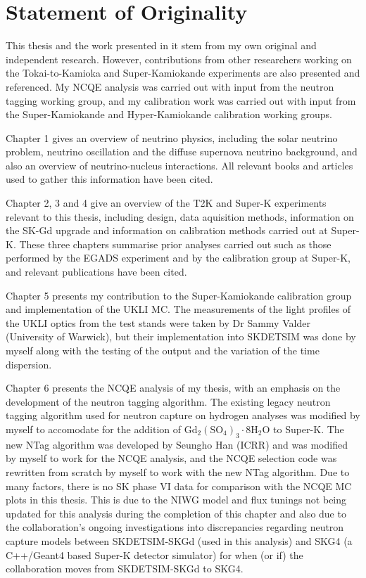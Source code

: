 \chapter*{Statement of Originality}
\thispagestyle{empty}

This thesis and the work presented in it stem from my own original and independent research. However, contributions from other researchers working on the Tokai-to-Kamioka and Super-Kamiokande experiments are also presented and referenced. My NCQE analysis was carried out with input from the neutron tagging working group, and my calibration work was carried out with input from the Super-Kamiokande and Hyper-Kamiokande calibration working groups.

Chapter 1 gives an overview of neutrino physics, including the solar neutrino problem, neutrino oscillation and the diffuse supernova neutrino background, and also an overview of neutrino-nucleus interactions. All relevant books and articles used to gather this information have been cited.

Chapter 2, 3 and 4 give an overview of the T2K and Super-K experiments relevant to this thesis, including design, data aquisition methods, information on the SK-Gd upgrade and information on calibration methods carried out at Super-K. These three chapters summarise prior analyses carried out such as those performed by the EGADS experiment and by the calibration group at Super-K, and relevant publications have been cited. 

Chapter 5 presents my contribution to the Super-Kamiokande calibration group and implementation of the UKLI MC. The measurements of the light profiles of the UKLI optics from the test stands were taken by Dr Sammy Valder (University of Warwick), but their implementation into SKDETSIM was done by myself along with the testing of the output and the variation of the time dispersion. 

Chapter 6 presents the NCQE analysis of my thesis, with an emphasis on the development of the neutron tagging algorithm. The existing legacy neutron tagging algorithm used for neutron capture on hydrogen analyses was modified by myself to accomodate for the addition of $\mathrm{Gd}_{2}\left(\mathrm{SO}_{4}\right)_{3} \cdot 8 \mathrm{H}_{2} \mathrm{O}$ to Super-K. The new NTag algorithm was developed by Seungho Han (ICRR) and was modified by myself to work for the NCQE analysis, and the NCQE selection code was rewritten from scratch by myself to work with the new NTag algorithm. Due to many factors, there is no SK phase VI data for comparison with the NCQE MC plots in this thesis. This is due to the NIWG model and flux tunings not being updated for this analysis during the completion of this chapter and also due to the collaboration's ongoing investigations into discrepancies regarding neutron capture models between SKDETSIM-SKGd (used in this analysis) and SKG4 (a C++/Geant4 based Super-K detector simulator) for when (or if) the collaboration moves from SKDETSIM-SKGd to SKG4. 

